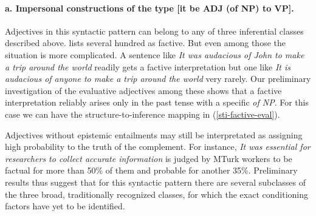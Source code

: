 \documentclass[10pt]{article}
\begin{document}
\vspace{-.2in}
\paragraph{a. Impersonal constructions of the type [it be ADJ (of NP) to VP].}
 Adjectives in this syntactic pattern can belong to any of three inferential classes described above. 
\cite{norrick:1978} lists several hundred as factive. But even among those 
the situation is more complicated. A sentence like \textit{It was audacious of John to make a trip around the world} readily gets a factive interpretation but one like \textit{It is audacious of anyone to make a trip around the world} very rarely. Our preliminary investigation of the evaluative adjectives among these shows that a factive interpretation reliably arises only in the past tense with a specific \textit{of NP}. For this case we can have the structure-to-inference mapping in (\ref{sti-factive-eval}).

\vspace{-0.5em}
\vspace{-0.5em}

Adjectives without epistemic entailments may still be interpretated as assigning high probability to the truth of the complement. For instance, \textit{It was essential for researchers to collect accurate information} is judged by MTurk workers to be factual for more than 50\% of them and probable for another 35\%. 
Preliminary results thus suggest that for this syntactic pattern there are several subclasses of the three broad, traditionally recognized classes, for which the exact conditioning factors have yet to be identified.

\vspace{-.2in}
\end{document}
